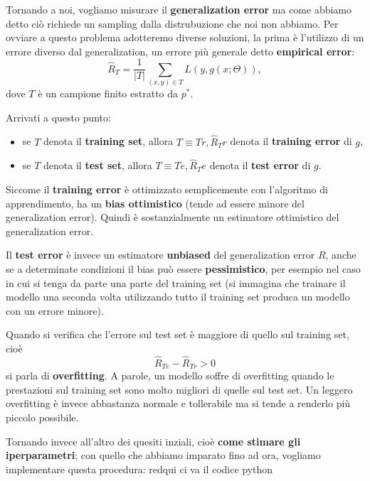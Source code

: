 Tornando a noi, vogliamo misurare il \textbf{generalization error} ma come abbiamo detto ciò richiede un sampling dalla distrubuzione che noi non abbiamo. Per ovviare a questo problema adotteremo diverse soluzioni, la prima è l'utilizzo di un errore diverso dal generalization, un errore più generale detto \textbf{empirical error}:
\begin{equation}
    \hat{R}_T=\dfrac{1}{|T|}\sum_{(x,y)\in T}L(y,g(x;\Theta)),
\end{equation}
dove $T$ è un campione finito estratto da $p^*$.


Arrivati a questo punto:
\begin{itemize}
    \item se  $T$ denota il \textbf{training set}, allora  $T \equiv Tr, \hat{R}_Tr$ denota il \textbf{training error} di $g$,
    \item se  $T$ denota il \textbf{test set}, allora  $T \equiv Te , \hat{R}_Te$ denota il \textbf{test error} di $g$.
\end{itemize}

Siccome il \textbf{training error} è ottimizzato semplicemente con l'algoritmo di apprendimento, ha un \textbf{bias ottimistico} (tende ad essere minore del generalization error). Quindi è sostanzialmente un estimatore ottimistico del generalization error.


Il \textbf{test error} è invece un estimatore \textbf{unbiased} del generalization error $R$, anche se a determinate condizioni il bias può essere \textbf{pessimistico}, per esempio nel caso in cui si tenga da parte una parte del training set (si immagina che trainare il modello una seconda volta utilizzando tutto il training set produca un modello con un errore minore). 


Quando si verifica che l'errore sul test set è maggiore di quello sul training set, cioè
\begin{equation}
    \hat{R}_{Te}-\hat{R}_{Tr} > 0
\end{equation}
si parla di \textbf{overfitting}. A parole, un modello soffre di overfitting quando le prestazioni sul training set sono molto migliori di quelle sul test set. Un leggero overfitting è invece abbastanza normale e tollerabile ma si tende a renderlo più piccolo possibile.\newpage

Tornando invece all'altro dei quesiti inziali, cioè \textbf{come stimare gli iperparametri}; con quello che abbiamo imparato fino ad ora, vogliamo implementare questa procedura: \newline
    redqui ci va il codice python\newline


